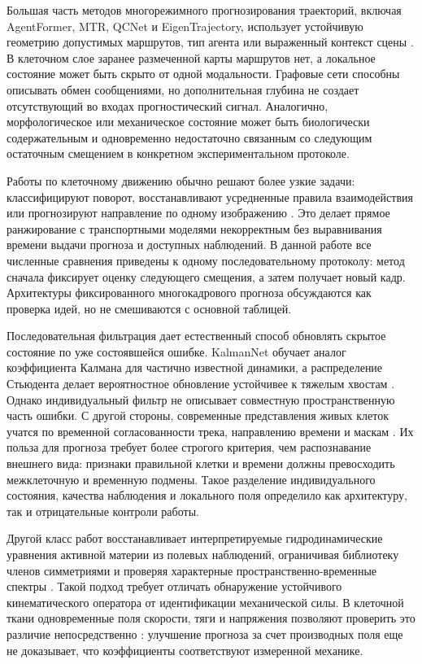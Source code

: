 \documentclass[11pt,a4paper]{article}
\begin{document}
Большая часть методов многорежимного прогнозирования траекторий, включая AgentFormer, MTR, QCNet и EigenTrajectory, использует устойчивую геометрию допустимых маршрутов, тип агента или выраженный контекст сцены \cite{ref8,ref9,ref10,ref11,ref12,ref13}. В клеточном слое заранее размеченной карты маршрутов нет, а локальное состояние может быть скрыто от одной модальности. Графовые сети способны описывать обмен сообщениями, но дополнительная глубина не создает отсутствующий во входах прогностический сигнал. Аналогично, морфологическое или механическое состояние может быть биологически содержательным и одновременно недостаточно связанным со следующим остаточным смещением в конкретном экспериментальном протоколе.

Работы по клеточному движению обычно решают более узкие задачи: классифицируют поворот, восстанавливают усредненные правила взаимодействия или прогнозируют направление по одному изображению \cite{ref1,ref5,ref21}. Это делает прямое ранжирование с транспортными моделями некорректным без выравнивания времени выдачи прогноза и доступных наблюдений. В данной работе все численные сравнения приведены к одному последовательному протоколу: метод сначала фиксирует оценку следующего смещения, а затем получает новый кадр. Архитектуры фиксированного многокадрового прогноза обсуждаются как проверка идей, но не смешиваются с основной таблицей.

Последовательная фильтрация дает естественный способ обновлять скрытое состояние по уже состоявшейся ошибке. KalmanNet обучает аналог коэффициента Калмана для частично известной динамики, а распределение Стьюдента делает вероятностное обновление устойчивее к тяжелым хвостам \cite{ref6,ref7}. Однако индивидуальный фильтр не описывает совместную пространственную часть ошибки. С другой стороны, современные представления живых клеток учатся по временной согласованности трека, направлению времени и маскам \cite{ref16,ref17,ref18,ref19}. Их польза для прогноза требует более строгого критерия, чем распознавание внешнего вида: признаки правильной клетки и времени должны превосходить межклеточную и временную подмены. Такое разделение индивидуального состояния, качества наблюдения и локального поля определило как архитектуру, так и отрицательные контроли работы.

Другой класс работ восстанавливает интерпретируемые гидродинамические уравнения активной материи из полевых наблюдений, ограничивая библиотеку членов симметриями и проверяя характерные пространственно-временные спектры \cite{ref32}. Такой подход требует отличать обнаружение устойчивого кинематического оператора от идентификации механической силы. В клеточной ткани одновременные поля скорости, тяги и напряжения позволяют проверить это различие непосредственно \cite{ref24}: улучшение прогноза за счет производных поля еще не доказывает, что коэффициенты соответствуют измеренной механике.
\end{document}

